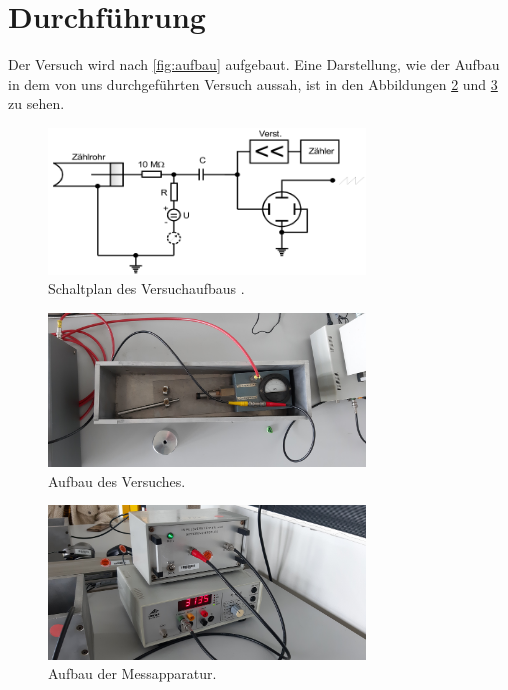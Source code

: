 \section{Durchführung}
\label{sec:Durchführung}

Der Versuch wird nach \autoref{fig:aufbau} aufgebaut. Eine Darstellung, wie der Aufbau in dem von uns durchgeführten Versuch aussah, ist in den Abbildungen \ref{fig:aufbau1} und \ref{fig:aufbau2} zu sehen.
\begin{figure}[H]
    \centering
    \includegraphics[width=0.75\textwidth]{data/Schaltplan.png}
    \caption{Schaltplan des Versuchaufbaus \cite{Anleitung703}.}
    \label{fig:aufbau}
\end{figure}

\begin{figure}[H]
    \centering
    \includegraphics[width=0.75\textwidth]{data/kasten.jpg}
    \caption{Aufbau des Versuches.}
    \label{fig:aufbau1}
\end{figure}

\begin{figure}[H]
    \centering
    \includegraphics[width=0.75\textwidth]{data/geigerMueller.jpg}
    \caption{Aufbau der Messapparatur.}
    \label{fig:aufbau2}
\end{figure}

